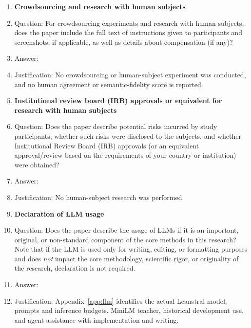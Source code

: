 \begin{enumerate}
\item {\bf Crowdsourcing and research with human subjects}
    \item[] Question: For crowdsourcing experiments and research with human subjects, does the paper include the full text of instructions given to participants and screenshots, if applicable, as well as details about compensation (if any)? 
    \item[] Answer: \answerNA{}
    \item[] Justification: No crowdsourcing or human-subject experiment was conducted, and no human agreement or semantic-fidelity score is reported.

\item {\bf Institutional review board (IRB) approvals or equivalent for research with human subjects}
    \item[] Question: Does the paper describe potential risks incurred by study participants, whether such risks were disclosed to the subjects, and whether Institutional Review Board (IRB) approvals (or an equivalent approval/review based on the requirements of your country or institution) were obtained?
    \item[] Answer: \answerNA{}
    \item[] Justification: No human-subject research was performed.

\item {\bf Declaration of LLM usage}
    \item[] Question: Does the paper describe the usage of LLMs if it is an important, original, or non-standard component of the core methods in this research? Note that if the LLM is used only for writing, editing, or formatting purposes and does \emph{not} impact the core methodology, scientific rigor, or originality of the research, declaration is not required.
    \item[] Answer: \answerYes{}
    \item[] Justification: Appendix~\ref{app:llm} identifies the actual Leanstral model, prompts and inference budgets, MiniLM teacher, historical development use, and agent assistance with implementation and writing.

\end{enumerate}
